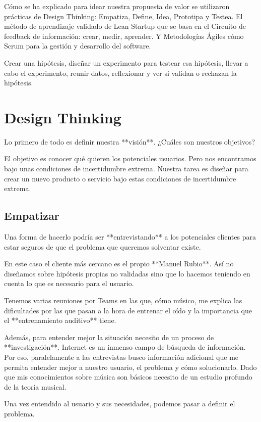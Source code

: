 \documentclass[12pt,twoside,titlepage]{report}
\begin{document}
{Cómo se ha explicado para idear nuestra propuesta de valor se utilizaron prácticas de Design Thinking: Empatiza, Define, Idea, Prototipa y Testea. El método de aprendizaje validado de Lean Startup que se basa en el Circuito de feedback de información: crear, medir, aprender. Y Metodologías Ágiles cómo Scrum para la gestión y desarrollo del software.

Crear una hipótesis, diseñar un experimento para testear esa hipótesis, llevar a cabo el experimento, reunir datos, reflexionar y ver si validan o rechazan la hipótesis.

\section{Design Thinking}

Lo primero de todo es definir nuestra **visión**. ¿Cuáles son nuestros objetivos?

El objetivo es conocer qué quieren los potenciales usuarios. Pero nos encontramos bajo unas condiciones de incertidumbre extrema. Nuestra tarea es diseñar para crear un nuevo producto o servicio bajo estas condiciones de incertidumbre extrema.

\subsection{Empatizar}

Una forma de hacerlo podría ser **entrevistando** a los potenciales clientes para estar seguros de que el problema que queremos solventar existe.

En este caso el cliente más cercano es el propio **Manuel Rubio**. Así no diseñamos sobre hipótesis propias no validadas sino que lo hacemos teniendo en cuenta lo que es necesario para el usuario.

Tenemos varias reuniones por Teams en las que, cómo músico, me explica las dificultades por las que pasan a la hora de entrenar el oído y la importancia que el **entrenamiento auditivo** tiene.

Además, para entender mejor la situación necesito de un proceso de **investigación**. Internet es un inmenso campo de búsqueda de información. Por eso, paralelamente a las entrevistas busco información adicional que me permita entender mejor a nuestro usuario, el problema y cómo solucionarlo. Dado que mis conocimientos sobre música son básicos necesito de un estudio profundo de la teoría musical. 

Una vez entendido al usuario y sus necesidades, podemos pasar a definir el problema.

}
\end{document}
